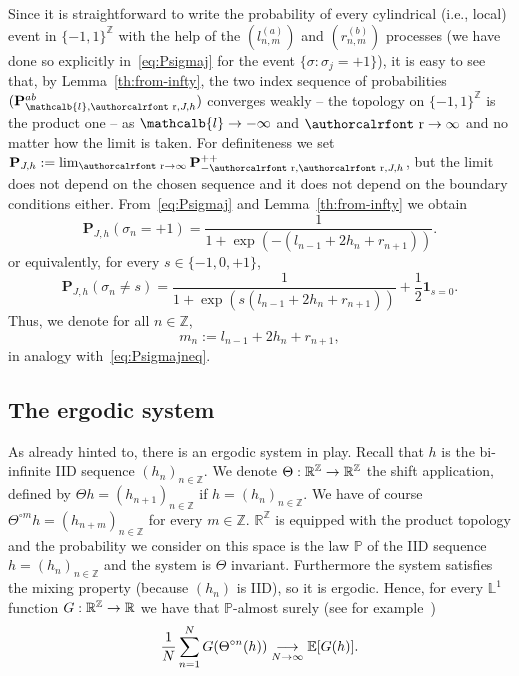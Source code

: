 \documentclass[10pt]{amsart}
\theoremstyle{definition}\newtheorem{defi}[theo]{Definition}\newtheorem{rema}[theo]{Remark}\newtheorem{exam}[theo]{Example}\newtheorem{exem}[theo]{Example}\newtheorem{nota}[theo]{Notation}
\newcommand{\mathcalc}[1]{\text{\authorcalrfont #1}}
\newcommand{\ind}{\mathbf{1}}
\newcommand{\bP}{\mathbf{P}}
\newcommand{\bbE}{\mathbb{E}}
\newcommand{\bbL}{\mathbb{L}}
\newcommand{\bbP}{\mathbb{P}}
\newcommand{\bbR}{\mathbb{R}}
\newcommand{\bbZ}{\mathbb{Z}}
\newcommand{\gs}{\sigma}
\renewcommand{\ell}{\mathcalb{l}}
\newcommand{\err}{\mathcalc{r}}
\renewcommand*{\to}{\mathchoice{\longrightarrow}{\rightarrow}{\rightarrow}{\rightarrow}}
\begin{document}
Since it is straightforward to write the probability of every cylindrical (i.e., local) event in $\{-1,1\}^\bbZ$ with the help of the $(l_{n, m}^{(a)})$ and $(r_{n,m}^{(b)})$ processes (we have done so explicitly in~\eqref{eq:Psigmaj} for the event $\{\gs: \gs_j=+1\}$), it is easy to see that, by Lemma~\ref{th:from-infty}, the two index sequence of probabilities $(\bP^{ab}_{\ell, \err, J, h})$ converges weakly -- the topology on $\{-1,1\}^\bbZ$ is the product one -- as $\ell \to -\infty$ and $\err \to \infty$ and no matter how the limit is taken. For definiteness we set $\bP_{ J, h}:= \lim_{\err \to \infty}\bP^{++}_{-\err, \err, J, h}$, but the limit does not depend on the chosen sequence and it does not depend on the boundary conditions either. From~\eqref{eq:Psigmaj} and Lemma~\ref{th:from-infty} we obtain
\begin{equation}\label{eq:Psigmajinf}
\bP_{ J, h}\left(\gs_n=+1\right)=
\frac 1 {1+ \exp\left(-\left(l_{n-1} + 2h_n+ r_{n+1}\right)\right)}.
\end{equation}
or equivalently, for every $s\in\{-1,0, +1\}$,
\begin{equation}\label{eq:Psigmajneqinf}
\bP_{ J, h}\left(\gs_n\neq s\right)=
\frac {1} {1+ \exp\left(s\left(l_{n-1} + 2h_n+ r_{n+1}\right)\right)}+\frac12\ind_{s=0}.
\end{equation}
Thus, we denote for all $n\in\bbZ$,
\begin{equation}\label{def-mn}
m_n:=l_{n-1} + 2h_n+ r_{n+1},
\end{equation}
in analogy with~\eqref{eq:Psigmajneq}.



\subsection{The ergodic system}

As already hinted to, there is an ergodic system in play. Recall that $h$ is the bi-infinite IID sequence $(h_n)_{n\in\bbZ}$. We denote $\Theta:\bbR^\bbZ\to \bbR^\bbZ$ the shift application, defined by $\Theta h=(h_{n+1})_{n\in \bbZ}$ if $h=(h_n)_{n\in\bbZ}$. We have of course $\Theta^{\circ m} h=(h_{n+m})_{n\in\bbZ}$ for every $m\in\bbZ$. $\bbR^\bbZ$ is equipped with the product topology and the probability we consider on this space is the law $\bbP$ of the IID sequence $h=(h_n)_{n\in\bbZ}$ and the system is $\Theta$ invariant. Furthermore the system satisfies the mixing property (because $(h_n)$ is IID), so it is ergodic. Hence, for every $\bbL^1$ function $G:\bbR^\bbZ \to \bbR$ we have that $\bbP$-almost surely (see for example~\cite[Chapter~5]{cf:MC})
\begin{equation}\label{eq:generalergstat}
\frac1N\sum_{n=1}^N G(\Theta^{\circ n}(h))\underset{N\to\infty}{\to} \bbE[G(h)].
\end{equation}
\medskip
\end{document}

